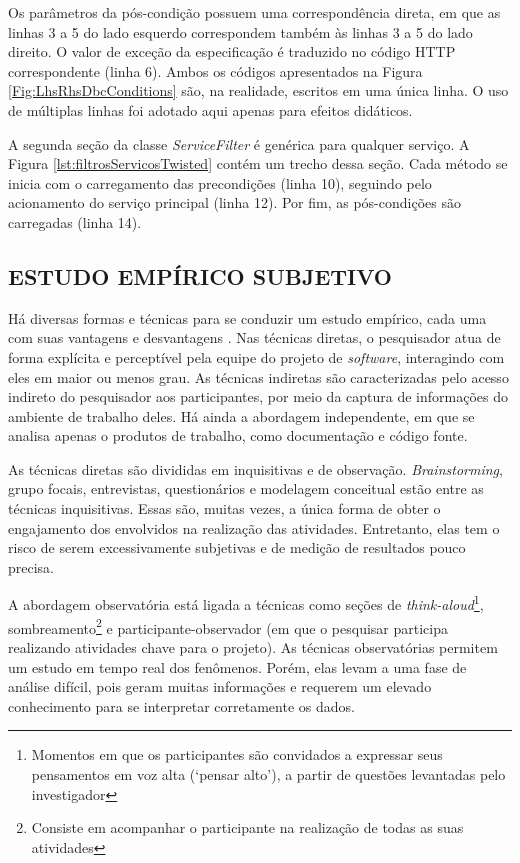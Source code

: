 Os parâmetros da pós-condição possuem uma correspondência direta, em que as
linhas 3 a 5 do lado esquerdo correspondem também às linhas 3 a 5 do lado
direito. O valor de exceção da especificação \neoidl{} é traduzido no código
HTTP correspondente (linha 6). Ambos os códigos apresentados na Figura
\ref{Fig:LhsRhsDbcConditions} são, na realidade, escritos em uma única linha.
O uso de múltiplas linhas foi adotado aqui apenas para efeitos didáticos.

A segunda seção da classe \emph{ServiceFilter} é genérica para
qualquer serviço. A Figura \ref{lst:filtrosServicosTwisted} contém um trecho
dessa seção. Cada método se inicia com o carregamento das precondições (linha
10), seguindo pelo acionamento do serviço principal (linha 12). Por fim,
as pós-condições são carregadas (linha 14).

\subsection{ESTUDO EMPÍRICO SUBJETIVO} 
\label{analiseSubjetiva}

Há diversas formas e técnicas para se conduzir um estudo empírico, cada uma com
suas vantagens e desvantagens \cite{shull2008guide}. Nas técnicas diretas, o pesquisador
atua de forma explícita e perceptível pela equipe do projeto de \textit{software}, interagindo
com eles em maior ou menos grau. As técnicas indiretas são caracterizadas pelo
acesso indireto do pesquisador aos participantes, por meio da captura de
informações do ambiente de trabalho deles. Há ainda a abordagem independente,
em que se analisa apenas o produtos de trabalho, como documentação e código
fonte.

As técnicas diretas são divididas em inquisitivas e de observação.
\textit{Brainstorming}, grupo focais, entrevistas, questionários e modelagem
conceitual estão entre as técnicas inquisitivas. Essas são, muitas vezes, a
única forma de obter o engajamento dos envolvidos na realização das atividades.
Entretanto, elas tem o risco de serem excessivamente subjetivas e de medição de
resultados pouco precisa.

A abordagem observatória está ligada a técnicas como seções de
\textit{think-aloud}\footnote{Momentos em que os participantes são
convidados a expressar seus pensamentos em voz alta (`pensar alto'), a partir de
questões levantadas pelo investigador}, sombreamento\footnote{Consiste
em acompanhar o participante na realização de todas as suas atividades} e
participante-observador (em que o pesquisar participa realizando 
atividades chave para o projeto).
As técnicas observatórias permitem um estudo em tempo real dos fenômenos. Porém, elas levam a uma fase de análise
difícil, pois geram muitas informações e requerem um elevado conhecimento para
se interpretar corretamente os dados.

